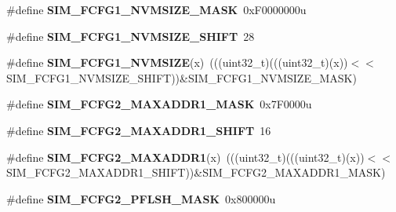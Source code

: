 \begin{DoxyCompactItemize}
\item 
\#define {\bfseries S\+I\+M\+\_\+\+F\+C\+F\+G1\+\_\+\+N\+V\+M\+S\+I\+Z\+E\+\_\+\+M\+A\+SK}~0x\+F0000000u\hypertarget{group__SIM__Register__Masks_ga048c88e59900fb06533d5cb2003414b7}{}\label{group__SIM__Register__Masks_ga048c88e59900fb06533d5cb2003414b7}

\item 
\#define {\bfseries S\+I\+M\+\_\+\+F\+C\+F\+G1\+\_\+\+N\+V\+M\+S\+I\+Z\+E\+\_\+\+S\+H\+I\+FT}~28\hypertarget{group__SIM__Register__Masks_ga8ec773a4e814bc88e7ab72da4e32316b}{}\label{group__SIM__Register__Masks_ga8ec773a4e814bc88e7ab72da4e32316b}

\item 
\#define {\bfseries S\+I\+M\+\_\+\+F\+C\+F\+G1\+\_\+\+N\+V\+M\+S\+I\+ZE}(x)~(((uint32\+\_\+t)(((uint32\+\_\+t)(x))$<$$<$S\+I\+M\+\_\+\+F\+C\+F\+G1\+\_\+\+N\+V\+M\+S\+I\+Z\+E\+\_\+\+S\+H\+I\+FT))\&S\+I\+M\+\_\+\+F\+C\+F\+G1\+\_\+\+N\+V\+M\+S\+I\+Z\+E\+\_\+\+M\+A\+SK)\hypertarget{group__SIM__Register__Masks_ga309821aeed7280f17110e4cf56582f4d}{}\label{group__SIM__Register__Masks_ga309821aeed7280f17110e4cf56582f4d}

\item 
\#define {\bfseries S\+I\+M\+\_\+\+F\+C\+F\+G2\+\_\+\+M\+A\+X\+A\+D\+D\+R1\+\_\+\+M\+A\+SK}~0x7\+F0000u\hypertarget{group__SIM__Register__Masks_ga4a9efde69ef5ab882d94b4ff6f659493}{}\label{group__SIM__Register__Masks_ga4a9efde69ef5ab882d94b4ff6f659493}

\item 
\#define {\bfseries S\+I\+M\+\_\+\+F\+C\+F\+G2\+\_\+\+M\+A\+X\+A\+D\+D\+R1\+\_\+\+S\+H\+I\+FT}~16\hypertarget{group__SIM__Register__Masks_ga4efd23d8fd9d589919b9b211ab523e09}{}\label{group__SIM__Register__Masks_ga4efd23d8fd9d589919b9b211ab523e09}

\item 
\#define {\bfseries S\+I\+M\+\_\+\+F\+C\+F\+G2\+\_\+\+M\+A\+X\+A\+D\+D\+R1}(x)~(((uint32\+\_\+t)(((uint32\+\_\+t)(x))$<$$<$S\+I\+M\+\_\+\+F\+C\+F\+G2\+\_\+\+M\+A\+X\+A\+D\+D\+R1\+\_\+\+S\+H\+I\+FT))\&S\+I\+M\+\_\+\+F\+C\+F\+G2\+\_\+\+M\+A\+X\+A\+D\+D\+R1\+\_\+\+M\+A\+SK)\hypertarget{group__SIM__Register__Masks_gaadeff570babcc1f87581f48ca4d2951f}{}\label{group__SIM__Register__Masks_gaadeff570babcc1f87581f48ca4d2951f}

\item 
\#define {\bfseries S\+I\+M\+\_\+\+F\+C\+F\+G2\+\_\+\+P\+F\+L\+S\+H\+\_\+\+M\+A\+SK}~0x800000u\hypertarget{group__SIM__Register__Masks_ga4d534ca03b47525916b93f9b2000d49a}{}\label{group__SIM__Register__Masks_ga4d534ca03b47525916b93f9b2000d49a}


\end{DoxyCompactItemize}
